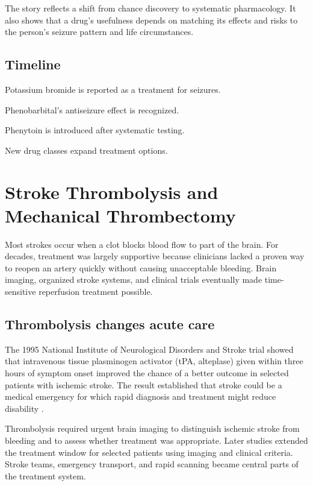 \documentclass[12pt,oneside]{book}
\begin{document}
The story reflects a shift from chance discovery to systematic pharmacology.
It also shows that a drug's usefulness depends on matching its effects and
risks to the person's seizure pattern and life circumstances.

\section*{Timeline}
\begin{description}[leftmargin=2.3cm,style=nextline]
  \item[1857] Potassium bromide is reported as a treatment for seizures.
  \item[1912] Phenobarbital's antiseizure effect is recognized.
  \item[1938] Phenytoin is introduced after systematic testing.
  \item[1960s onward] New drug classes expand treatment options.
\end{description}
\chapter[Stroke Thrombolysis and Mechanical Thrombectomy]{Stroke Thrombolysis and Mechanical Thrombectomy}

Most strokes occur when a clot blocks blood flow to part of the brain. For
decades, treatment was largely supportive because clinicians lacked a proven
way to reopen an artery quickly without causing unacceptable bleeding. Brain
imaging, organized stroke systems, and clinical trials eventually made
time-sensitive reperfusion treatment possible.

\section{Thrombolysis changes acute care}
The 1995 National Institute of Neurological Disorders and Stroke trial showed that intravenous tissue plasminogen activator (tPA, alteplase) given within three hours of symptom onset improved the chance of a better outcome in selected patients with ischemic stroke. The result established that stroke could be a medical emergency for which rapid diagnosis and treatment might reduce disability \cite{nindsTpaTrial}.

Thrombolysis required urgent brain imaging to distinguish ischemic stroke from
bleeding and to assess whether treatment was appropriate. Later studies
extended the treatment window for selected patients using imaging and clinical
criteria. Stroke teams, emergency transport, and rapid scanning became central
parts of the treatment system.
\end{document}
